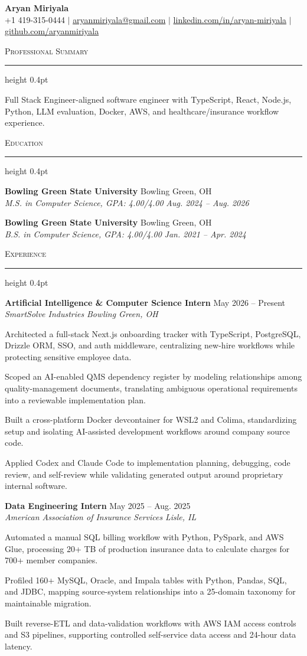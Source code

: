 \documentclass[letterpaper,11pt]{article}
\newcommand{\resumesection}[1]{%
  \par\vspace{2pt}%
  {\large\scshape #1}\par\vspace{2pt}%
  \hrule height 0.4pt\vspace{2pt}%
}
\newcommand{\resumeSubheading}[4]{
  \textbf{#1} \hfill #2\\
  \textit{#3} \hfill \textit{#4}
}
\begin{document}
\begin{center}
  {\LARGE \textbf{Aryan Miriyala}}\\[-1pt]
  \small
  +1 419-315-0444 $|$
  \href{mailto:aryanmiriyala@gmail.com}{aryanmiriyala@gmail.com} $|$
  \href{https://www.linkedin.com/in/aryan-miriyala-7788a21b6/}{linkedin.com/in/aryan-miriyala} $|$
  \href{https://github.com/aryanmiriyala}{github.com/aryanmiriyala}
\end{center}\vspace{-10pt}

\resumesection{Professional Summary}
Full Stack Engineer-aligned software engineer with TypeScript, React, Node.js, Python, LLM evaluation, Docker, AWS, and healthcare/insurance workflow experience.

\resumesection{Education}
\resumeSubheading
{Bowling Green State University}{Bowling Green, OH}
{M.S. in Computer Science, GPA: 4.00/4.00}{Aug. 2024 -- Aug. 2026}

\resumeSubheading
{Bowling Green State University}{Bowling Green, OH}
{B.S. in Computer Science, GPA: 4.00/4.00}{Jan. 2021 -- Apr. 2024}

\resumesection{Experience}
\resumeSubheading
{Artificial Intelligence \& Computer Science Intern}{May 2026 -- Present}
{SmartSolve Industries}{Bowling Green, OH}
\begin{tightitemize}
  \item Architected a full-stack Next.js onboarding tracker with TypeScript, PostgreSQL, Drizzle ORM, SSO, and auth middleware, centralizing new-hire workflows while protecting sensitive employee data.
  \item Scoped an AI-enabled QMS dependency register by modeling relationships among quality-management documents, translating ambiguous operational requirements into a reviewable implementation plan.
  \item Built a cross-platform Docker devcontainer for WSL2 and Colima, standardizing setup and isolating AI-assisted development workflows around company source code.
  \item Applied Codex and Claude Code to implementation planning, debugging, code review, and self-review while validating generated output around proprietary internal software.
\end{tightitemize}

\resumeSubheading
{Data Engineering Intern}{May 2025 -- Aug. 2025}
{American Association of Insurance Services}{Lisle, IL}
\begin{tightitemize}
  \item Automated a manual SQL billing workflow with Python, PySpark, and AWS Glue, processing 20+ TB of production insurance data to calculate charges for 700+ member companies.
  \item Profiled 160+ MySQL, Oracle, and Impala tables with Python, Pandas, SQL, and JDBC, mapping source-system relationships into a 25-domain taxonomy for maintainable migration.
  \item Built reverse-ETL and data-validation workflows with AWS IAM access controls and S3 pipelines, supporting controlled self-service data access and 24-hour data latency.
\end{tightitemize}
\end{document}
